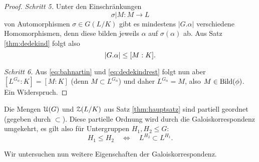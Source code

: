 \documentclass{book}
\begin{document}
\begin{proof}
    \noindent
    \emph{Schritt 5.} Unter den Einschränkungen 
    \[
        \sigma|M : M \to L
    \]
    von Automorphismen $\sigma \in G(L/K)$ gibt es mindestens $|G.\alpha|$
    verschiedene Homomorphismen, denn diese bilden jeweils $\alpha$ auf
    $\sigma(\alpha)$ ab. Aus Satz \ref{thm:dedekind} folgt also
    \begin{equation}
        \label{eq:dedekindrest}
        |G.\alpha| \le [M:K].\\[1ex]
    \end{equation}

    \noindent
    \emph{Schritt 6.} Aus \eqref{eq:bahnartin} und \eqref{eq:dedekindrest}
    folgt nun aber $[L^{G_{\alpha}}:K] = [M:K]$ (denn $M \subset
    L^{G_{\alpha}}$) und daher $L^{G_{\alpha}} = M$, also $M \in \Bild(\phi)$. Ein Widerspruch.
\end{proof}

\begin{rem}
    \label{rem:galoisordnung}
    Die Mengen $\EuScript{U}(G)$ und $\EuScript{Z}(L/K)$ aus Satz \ref{thm:hauptsatz} sind
    partiell geordnet (gegeben durch $\subset$). Diese partielle Ordnung wird
    durch die Galoiskorrespondenz umgekehrt, es gilt also für Untergruppen
    $H_1,H_2 \le
    G$:
    \[
        H_1 \le H_2 \quad \iff \quad L^{H_2} \subset L^{H_1}.
    \]
\end{rem}

Wir untersuchen nun weitere Eigenschaften der Galoiskorrespondenz. 
\end{document}
